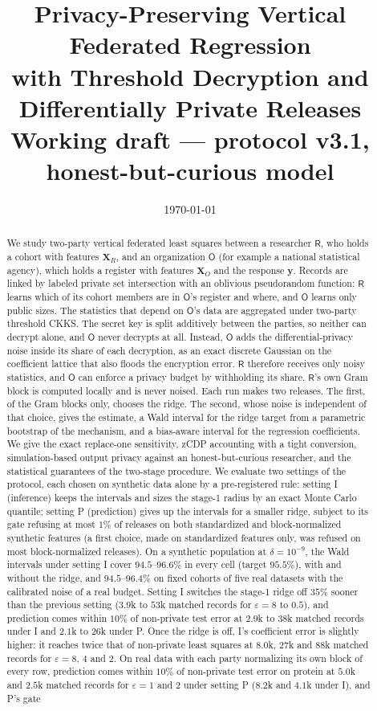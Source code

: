 \documentclass[11pt]{article}
\title{%
  \textbf{Privacy-Preserving Vertical Federated Regression}\\[4pt]
  \large with Threshold Decryption and Differentially Private Releases\\[8pt]
  \normalsize Working draft --- protocol v3.1, honest-but-curious model
}
\date{\today}
\theoremstyle{definition}
\theoremstyle{plain}
\newcommand{\bXR}{\mathbf{X}_{R}}
\newcommand{\bXO}{\mathbf{X}_{O}}
\newcommand{\by}{\mathbf{y}}
\newcommand{\Party}[1]{\textsf{#1}}
\newcommand{\Rp}{\Party{R}}
\newcommand{\Op}{\Party{O}}
\begin{document}
\maketitle

\begin{abstract}
We study two-party vertical federated least squares between a researcher $\Rp$, who holds a cohort with features $\bXR$, and an organization $\Op$ (for example a national statistical agency), which holds a register with features $\bXO$ and the response $\by$. Records are linked by labeled private set intersection with an oblivious pseudorandom function: $\Rp$ learns which of its cohort members are in $\Op$'s register and where, and $\Op$ learns only public sizes. The statistics that depend on $\Op$'s data are aggregated under two-party threshold CKKS. The secret key is split additively between the parties, so neither can decrypt alone, and $\Op$ never decrypts at all. Instead, $\Op$ adds the differential-privacy noise inside its share of each decryption, as an exact discrete Gaussian on the coefficient lattice that also floods the encryption error. $\Rp$ therefore receives only noisy statistics, and $\Op$ can enforce a privacy budget by withholding its share. $\Rp$'s own Gram block is computed locally and is never noised. Each run makes two releases. The first, of the Gram blocks only, chooses the ridge. The second, whose noise is independent of that choice, gives the estimate, a Wald interval for the ridge target from a parametric bootstrap of the mechanism, and a bias-aware interval for the regression coefficients. We give the exact replace-one sensitivity, zCDP accounting with a tight conversion, simulation-based output privacy against an honest-but-curious researcher, and the statistical guarantees of the two-stage procedure. We evaluate two settings of the protocol, each chosen on synthetic data alone by a pre-registered rule: setting I (inference) keeps the intervals and sizes the stage-1 radius by an exact Monte Carlo quantile; setting P (prediction) gives up the intervals for a smaller ridge, subject to its gate refusing at most $1\%$ of releases on both standardized and block-normalized synthetic features (a first choice, made on standardized features only, was refused on most block-normalized releases). On a synthetic population at $\delta = 10^{-9}$, the Wald intervals under setting I cover $94.5$--$96.6\%$ in every cell (target $95.5\%$), with and without the ridge, and $94.5$--$96.4\%$ on fixed cohorts of five real datasets with the calibrated noise of a real budget. Setting I switches the stage-1 ridge off $35\%$ sooner than the previous setting ($3.9$k to $53$k matched records for $\varepsilon = 8$ to $0.5$), and prediction comes within $10\%$ of non-private test error at $2.9$k to $38$k matched records under I and $2.1$k to $26$k under P. Once the ridge is off, I's coefficient error is slightly higher: it reaches twice that of non-private least squares at $8.0$k, $27$k and $88$k matched records for $\varepsilon = 8$, $4$ and $2$. On real data with each party normalizing its own block of every row, prediction comes within $10\%$ of non-private test error on protein at $5.0$k and $2.5$k matched records for $\varepsilon = 1$ and $2$ under setting P ($8.2$k and $4.1$k under I), and P's gate 
\end{abstract}
\end{document}
